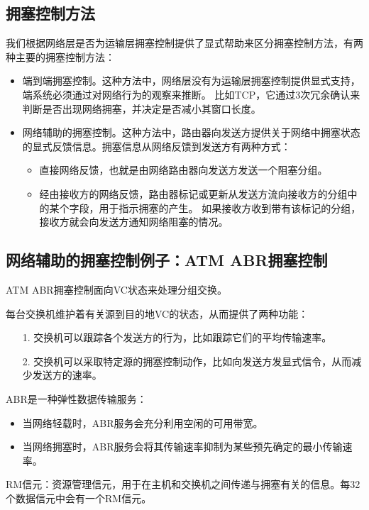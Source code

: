 \documentclass[a4paper,left=2.5cm,right=2.5cm,11pt]{article}
\begin{document}
\subsection{拥塞控制方法}
	我们根据网络层是否为运输层拥塞控制提供了显式帮助来区分拥塞控制方法，有两种主要的拥塞控制方法：
	\begin{itemize}
		\item 端到端拥塞控制。这种方法中，网络层没有为运输层拥塞控制提供显式支持，端系统必须通过对网络行为的观察来推断。
			  比如TCP，它通过3次冗余确认来判断是否出现网络拥塞，并决定是否减小其窗口长度。
		\item 网络辅助的拥塞控制。这种方法中，路由器向发送方提供关于网络中拥塞状态的显式反馈信息。拥塞信息从网络反馈到发送方有两种方式：
			  \begin{itemize}
				  \item 直接网络反馈，也就是由网络路由器向发送方发送一个阻塞分组。
				  \item 经由接收方的网络反馈，路由器标记或更新从发送方流向接收方的分组中的某个字段，用于指示拥塞的产生。
				        如果接收方收到带有该标记的分组，接收方就会向发送方通知网络阻塞的情况。
			  \end{itemize}
	\end{itemize}

\subsection{网络辅助的拥塞控制例子：ATM ABR拥塞控制}
	ATM ABR拥塞控制面向VC状态来处理分组交换。\par
	每台交换机维护着有关源到目的地VC的状态，从而提供了两种功能：
	\begin{itemize}
		\item[1.] 交换机可以跟踪各个发送方的行为，比如跟踪它们的平均传输速率。
		\item[2.] 交换机可以采取特定源的拥塞控制动作，比如向发送方发显式信令，从而减少发送方的速率。
	\end{itemize}

	ABR是一种弹性数据传输服务：
	\begin{itemize}
		\item 当网络轻载时，ABR服务会充分利用空闲的可用带宽。
		\item 当网络拥塞时，ABR服务会将其传输速率抑制为某些预先确定的最小传输速率。
	\end{itemize}

	RM信元：资源管理信元，用于在主机和交换机之间传递与拥塞有关的信息。每32个数据信元中会有一个RM信元。\par
\end{document}

